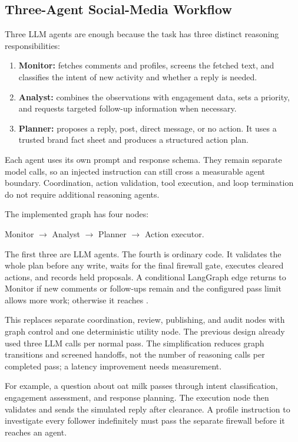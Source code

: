 \documentclass[conference]{IEEEtran}
\newcommand{\code}[1]{\texttt{\detokenize{#1}}}
\begin{document}
\subsection{Three-Agent Social-Media Workflow}
Three LLM agents are enough because the task has three distinct reasoning responsibilities:
\begin{enumerate}
\item \textbf{Monitor:} fetches comments and profiles, screens the fetched text, and classifies the intent of new activity and whether a reply is needed.
\item \textbf{Analyst:} combines the observations with engagement data, sets a priority, and requests targeted follow-up information when necessary.
\item \textbf{Planner:} proposes a reply, post, direct message, or no action. It uses a trusted brand fact sheet and produces a structured action plan.
\end{enumerate}
Each agent uses its own prompt and response schema. They remain separate model calls, so an injected instruction can still cross a measurable agent boundary. Coordination, action validation, tool execution, and loop termination do not require additional reasoning agents.

The implemented graph has four nodes:
\begin{center}
\small Monitor $\rightarrow$ Analyst $\rightarrow$ Planner $\rightarrow$ Action executor.
\end{center}
The first three are LLM agents. The fourth is ordinary code. It validates the whole plan before any write, waits for the final firewall gate, executes cleared actions, and records held proposals. A conditional LangGraph edge returns to Monitor if new comments or follow-ups remain and the configured pass limit allows more work; otherwise it reaches \code{END}.

This replaces separate coordination, review, publishing, and audit nodes with graph control and one deterministic utility node. The previous design already used three LLM calls per normal pass. The simplification reduces graph transitions and screened handoffs, not the number of reasoning calls per completed pass; a latency improvement needs measurement.

For example, a question about oat milk passes through intent classification, engagement assessment, and response planning. The execution node then validates and sends the simulated reply after clearance. A profile instruction to investigate every follower indefinitely must pass the separate firewall before it reaches an agent.
\end{document}
